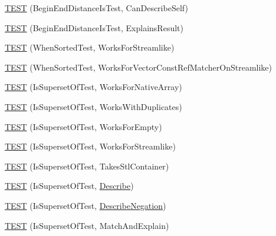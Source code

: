 \begin{DoxyCompactItemize}
\item 
\mbox{\hyperlink{namespacetesting_1_1gmock__matchers__test_aa4ef2a94a7d75aa6116e8537deaa5f56}{T\+E\+ST}} (Begin\+End\+Distance\+Is\+Test, Can\+Describe\+Self)
\item 
\mbox{\hyperlink{namespacetesting_1_1gmock__matchers__test_a89445da783c74dfa09c9c09531646f5b}{T\+E\+ST}} (Begin\+End\+Distance\+Is\+Test, Explains\+Result)
\item 
\mbox{\hyperlink{namespacetesting_1_1gmock__matchers__test_a8de8e3760418cfcd33913cd30f16d117}{T\+E\+ST}} (When\+Sorted\+Test, Works\+For\+Streamlike)
\item 
\mbox{\hyperlink{namespacetesting_1_1gmock__matchers__test_aa6bfe7b6cc288d93f60b9f52e095b233}{T\+E\+ST}} (When\+Sorted\+Test, Works\+For\+Vector\+Const\+Ref\+Matcher\+On\+Streamlike)
\item 
\mbox{\hyperlink{namespacetesting_1_1gmock__matchers__test_a1f8296847490a883c0e86f8f90e4c6d5}{T\+E\+ST}} (Is\+Superset\+Of\+Test, Works\+For\+Native\+Array)
\item 
\mbox{\hyperlink{namespacetesting_1_1gmock__matchers__test_a1ae4040ea2af432956d7486bb3f85286}{T\+E\+ST}} (Is\+Superset\+Of\+Test, Works\+With\+Duplicates)
\item 
\mbox{\hyperlink{namespacetesting_1_1gmock__matchers__test_a979b33284277cfca18fe91af3892667a}{T\+E\+ST}} (Is\+Superset\+Of\+Test, Works\+For\+Empty)
\item 
\mbox{\hyperlink{namespacetesting_1_1gmock__matchers__test_a2606545708e4ce6d38284c66109f604d}{T\+E\+ST}} (Is\+Superset\+Of\+Test, Works\+For\+Streamlike)
\item 
\mbox{\hyperlink{namespacetesting_1_1gmock__matchers__test_a7f20d0da713270b05ac281034db4474d}{T\+E\+ST}} (Is\+Superset\+Of\+Test, Takes\+Stl\+Container)
\item 
\mbox{\hyperlink{namespacetesting_1_1gmock__matchers__test_aa2c2618b90199acf6fbfd744ed4e06e6}{T\+E\+ST}} (Is\+Superset\+Of\+Test, \mbox{\hyperlink{namespacetesting_1_1gmock__matchers__test_a738a538e1705ea49670aeb3ed25108e6}{Describe}})
\item 
\mbox{\hyperlink{namespacetesting_1_1gmock__matchers__test_adaaba3b4b2c1bdecc2cf6b2fda60e48f}{T\+E\+ST}} (Is\+Superset\+Of\+Test, \mbox{\hyperlink{namespacetesting_1_1gmock__matchers__test_a96c18b92dede79060a7303fe5d178faf}{Describe\+Negation}})
\item 
\mbox{\hyperlink{namespacetesting_1_1gmock__matchers__test_aa0e49e413718410f6c218a8cea29efb5}{T\+E\+ST}} (Is\+Superset\+Of\+Test, Match\+And\+Explain)

\end{DoxyCompactItemize}

